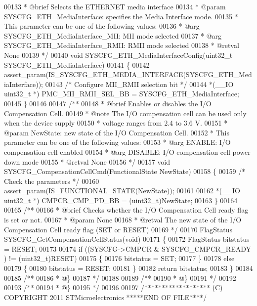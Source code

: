 \begin{DoxyCode}
00133 \textcolor{comment}{  * @brief  Selects the ETHERNET media interface }
00134 \textcolor{comment}{  * @param  SYSCFG\_ETH\_MediaInterface: specifies the Media Interface mode. }
00135 \textcolor{comment}{  *          This parameter can be one of the following values: }
00136 \textcolor{comment}{  *            @arg SYSCFG\_ETH\_MediaInterface\_MII: MII mode selected}
00137 \textcolor{comment}{  *            @arg SYSCFG\_ETH\_MediaInterface\_RMII: RMII mode selected }
00138 \textcolor{comment}{  * @retval None }
00139 \textcolor{comment}{  */}
00140 \textcolor{keywordtype}{void} SYSCFG_ETH_MediaInterfaceConfig(uint32\_t SYSCFG\_ETH\_MediaInterface)
00141 \{
00142   assert_param(IS\_SYSCFG\_ETH\_MEDIA\_INTERFACE(SYSCFG\_ETH\_MediaInterface));
00143   \textcolor{comment}{/* Configure MII\_RMII selection bit */}
00144   *(\_\_IO uint32\_t *) PMC_MII_RMII_SEL_BB = SYSCFG\_ETH\_MediaInterface;
00145 \}
00146 
00147 \textcolor{comment}{/**}
00148 \textcolor{comment}{  * @brief  Enables or disables the I/O Compensation Cell.}
00149 \textcolor{comment}{  * @note   The I/O compensation cell can be used only when the device supply}
00150 \textcolor{comment}{  *         voltage ranges from 2.4 to 3.6 V.  }
00151 \textcolor{comment}{  * @param  NewState: new state of the I/O Compensation Cell.}
00152 \textcolor{comment}{  *          This parameter can be one of the following values:}
00153 \textcolor{comment}{  *            @arg ENABLE: I/O compensation cell enabled  }
00154 \textcolor{comment}{  *            @arg DISABLE: I/O compensation cell power-down mode  }
00155 \textcolor{comment}{  * @retval None}
00156 \textcolor{comment}{  */}
00157 \textcolor{keywordtype}{void} SYSCFG_CompensationCellCmd(FunctionalState NewState)
00158 \{
00159   \textcolor{comment}{/* Check the parameters */}
00160   assert_param(IS\_FUNCTIONAL\_STATE(NewState));
00161 
00162   *(\_\_IO uint32\_t *) CMPCR_CMP_PD_BB = (uint32\_t)NewState;
00163 \}
00164 
00165 \textcolor{comment}{/**}
00166 \textcolor{comment}{  * @brief  Checks whether the I/O Compensation Cell ready flag is set or not.}
00167 \textcolor{comment}{  * @param  None}
00168 \textcolor{comment}{  * @retval The new state of the I/O Compensation Cell ready flag (SET or RESET)}
00169 \textcolor{comment}{  */}
00170 FlagStatus SYSCFG_GetCompensationCellStatus(\textcolor{keywordtype}{void})
00171 \{
00172   FlagStatus bitstatus = RESET;
00173 
00174   \textcolor{keywordflow}{if} ((SYSCFG->CMPCR & SYSCFG_CMPCR_READY ) != (uint32\_t)RESET)
00175   \{
00176     bitstatus = SET;
00177   \}
00178   \textcolor{keywordflow}{else}
00179   \{
00180     bitstatus = RESET;
00181   \}
00182   \textcolor{keywordflow}{return} bitstatus;
00183 \}
00184 
00185 \textcolor{comment}{/**}
00186 \textcolor{comment}{  * @\}}
00187 \textcolor{comment}{  */}
00188 
00189 \textcolor{comment}{/**}
00190 \textcolor{comment}{  * @\}}
00191 \textcolor{comment}{  */}
00192 
00193 \textcolor{comment}{/**}
00194 \textcolor{comment}{  * @\}}
00195 \textcolor{comment}{  */}
00196 
00197 \textcolor{comment}{/******************* (C) COPYRIGHT 2011 STMicroelectronics *****END OF FILE****/}
\end{DoxyCode}
